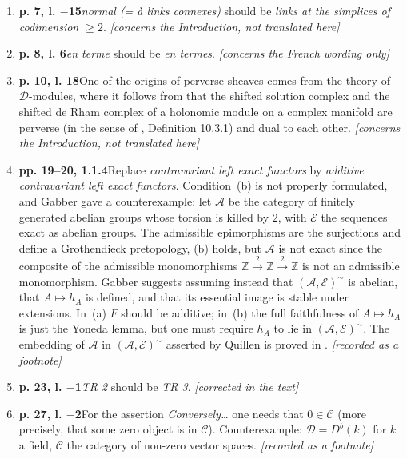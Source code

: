 \documentclass[12pt,oneside]{amsbook}
\theoremstyle{plain}
\theoremstyle{definition}
\newcommand{\AAA}{\mathcal{A}}
\newcommand{\ZZ}{\mathbb{Z}}  \newcommand{\QQ}{\mathbb{Q}}
\begin{document}
\begin{enumerate}[label={\arabic*.},leftmargin=2.6em,itemsep=4pt]
\item \textbf{p. 7, l. $-$15}\quad \emph{normal (= à links connexes)} should be \emph{links at the simplices of codimension $\geq 2$}. \hfill\newline \textsl{[concerns the Introduction, not translated here]}
\item \textbf{p. 8, l. 6}\quad \emph{en terme} should be \emph{en termes}. \hfill\newline \textsl{[concerns the French wording only]}
\item \textbf{p. 10, l. 18}\quad One of the origins of perverse sheaves comes from the theory of $\mathcal{D}$-modules, where it follows from \cite{Kas75} that the shifted solution complex and the shifted de Rham complex of a holonomic module on a complex manifold are perverse (in the sense of \cite{KS90}, Definition 10.3.1) and dual to each other. \hfill\newline \textsl{[concerns the Introduction, not translated here]}
\item \textbf{pp. 19--20, 1.1.4}\quad Replace \emph{contravariant left exact functors} by \emph{additive contravariant left exact functors}. Condition~(b) is not properly formulated, and Gabber gave a counterexample: let $\AAA$ be the category of finitely generated abelian groups whose torsion is killed by $2$, with $\mathcal{E}$ the sequences exact as abelian groups. The admissible epimorphisms are the surjections and define a Grothendieck pretopology, (b) holds, but $\AAA$ is not exact since the composite of the admissible monomorphisms $\ZZ\xrightarrow{2}\ZZ\xrightarrow{2}\ZZ$ is not an admissible monomorphism. Gabber suggests assuming instead that $(\AAA,\mathcal{E})^{\sim}$ is abelian, that $A\mapsto h_{A}$ is defined, and that its essential image is stable under extensions. In~(a) $F$ should be additive; in~(b) the full faithfulness of $A\mapsto h_{A}$ is just the Yoneda lemma, but one must require $h_{A}$ to lie in $(\AAA,\mathcal{E})^{\sim}$. The embedding of $\AAA$ in $(\AAA,\mathcal{E})^{\sim}$ asserted by Quillen is proved in \cite{Lau83}. \hfill\newline \textsl{[recorded as a footnote]}
\item \textbf{p. 23, l. $-$1}\quad \emph{TR 2} should be \emph{TR 3}. \hfill\newline \textsl{[corrected in the text]}
\item \textbf{p. 27, l. $-$2}\quad For the assertion \emph{Conversely\dots} one needs that $0\in\mathcal{C}$ (more precisely, that some zero object is in $\mathcal{C}$). Counterexample: $\mathcal{D}=D^{b}(k)$ for $k$ a field, $\mathcal{C}$ the category of non-zero vector spaces. \hfill\newline \textsl{[recorded as a footnote]}

\end{enumerate}
\end{document}
